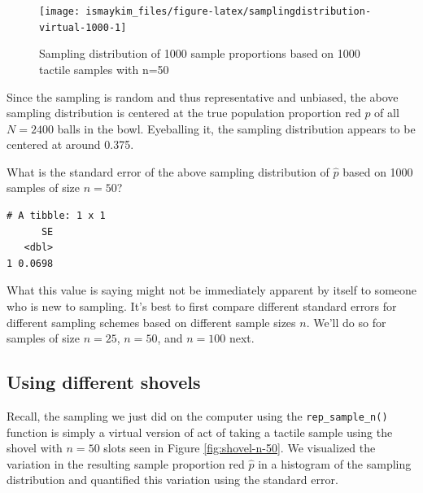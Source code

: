 \documentclass[12pt,]{krantz}
\makeatletter
\newenvironment{Shaded}{\begin{snugshade}}{\end{snugshade}}
\newcommand{\KeywordTok}[1]{\textcolor[rgb]{0.27,0.27,0.27}{\textbf{#1}}}
\newcommand{\DataTypeTok}[1]{\textcolor[rgb]{0.27,0.27,0.27}{#1}}
\newcommand{\StringTok}[1]{\textcolor[rgb]{0.5,0.5,0.5}{#1}}
\newcommand{\OperatorTok}[1]{\textcolor[rgb]{0.43,0.43,0.43}{\textbf{#1}}}
\newcommand{\NormalTok}[1]{#1}
\newenvironment{kframe}{%
\medskip{}
\setlength{\fboxsep}{.8em}
 \def\at@end@of@kframe{}%
 \ifinner\ifhmode%
  \def\at@end@of@kframe{\end{minipage}}%
  \begin{minipage}{\columnwidth}%
 \fi\fi%
 \def\FrameCommand##1{\hskip\@totalleftmargin \hskip-\fboxsep
 \colorbox{shadecolor}{##1}\hskip-\fboxsep
     \hskip-\linewidth \hskip-\@totalleftmargin \hskip\columnwidth}%
 \MakeFramed {\advance\hsize-\width
   \@totalleftmargin\z@ \linewidth\hsize
   \@setminipage}}%
 {\par\unskip\endMakeFramed%
 \at@end@of@kframe}
\renewenvironment{Shaded}{\begin{kframe}}{\end{kframe}}
\makeatother
\begin{document}
\begin{figure}

{\centering \texttt{[image: ismaykim\_files/figure-latex/samplingdistribution-virtual-1000-1]} 

}

\caption{Sampling distribution of 1000 sample proportions based on 1000 tactile samples with n=50}\label{fig:samplingdistribution-virtual-1000}
\end{figure}

Since the sampling is random and thus representative and unbiased, the
above sampling distribution is centered at the true population
proportion red \(p\) of all \(N=2400\) balls in the bowl. Eyeballing it,
the sampling distribution appears to be centered at around 0.375.

What is the standard error of the above sampling distribution of
\(\widehat{p}\) based on 1000 samples of size \(n=50\)?

\begin{Shaded}
\end{Shaded}

\begin{verbatim}
# A tibble: 1 x 1
      SE
   <dbl>
1 0.0698
\end{verbatim}

What this value is saying might not be immediately apparent by itself to
someone who is new to sampling. It's best to first compare different
standard errors for different sampling schemes based on different sample
sizes \(n\). We'll do so for samples of size \(n=25\), \(n=50\), and
\(n=100\) next.

\subsection{Using different shovels}\label{using-different-shovels}

Recall, the sampling we just did on the computer using the
\texttt{rep\_sample\_n()} function is simply a virtual version of act of
taking a tactile sample using the shovel with \(n=50\) slots seen in
Figure \ref{fig:shovel-n-50}. We visualized the variation in the
resulting sample proportion red \(\widehat{p}\) in a histogram of the
sampling distribution and quantified this variation using the standard
error.
\end{document}
